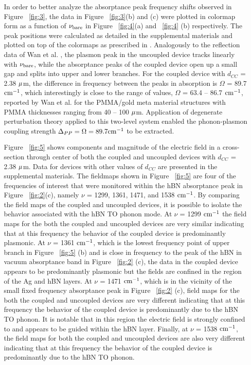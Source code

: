 \documentclass[12pt]{report}
\begin{document}
    In order to better analyze the absorptance peak frequency shifts observed in Figure ~\ref{fig:3}, the data in Figure ~\ref{fig:3}(b) and (c) were plotted in colormap form as a function of $\nu_{\rm{bare}}$ in Figure ~\ref{fig:4}(a) and ~\ref{fig:4} (b) respectively. The peak positions were calculated as detailed in the supplemental materials and plotted on top of the colormaps as prescribed in \cite{Wan:16}. Analogously to the reflection data of Wan et al. \cite{Wan:16}, the plasmon peak in the uncoupled device tracks linearly with $\nu_{\rm{bare}}$, while the absorptance peaks of the coupled device open up a small gap and splits into upper and lower branches. For the coupled device with $d_{CC}$ = 2.38 $\rm \mu$m, the difference in frequency between the peaks in absorption is $\Omega$ = 89.7 $\rm cm^{-1}$, which interestingly is close to the range of values, $\Omega$ = 63.4 – 86.7 $\rm cm^{-1}$, reported by Wan et al. for the PMMA/gold meta material structures with PMMA thicknesses ranging from 40 – 100 $\rm \mu$m. Application of degenerate perturbation theory \cite{Sakurai:17} applied to this two-level system enabled the phonon-plasmon coupling strength $\Delta_{PP} = \rm  \Omega = 89.7 cm^{-1}$ to be extracted.

    Figure ~\ref{fig:5} shows components and magnitude of the electric field in a cross-section through center of both the coupled and uncoupled devices with $d_{CC}$  = 2.38 $\rm \mu$m. Data for devices with other values of $d_{CC}$  are presented in the supplemental materials. The fieldmaps shown in Figure ~\ref{fig:5} are four of the frequencies of interest that were monitored within the hBN absorptance peak in Figure ~\ref{fig:2}(c), namely $\nu$ = 1299, 1361, 1471, and 1538 $\rm cm^{-1}$. By comparing the field maps of the coupled and uncoupled devices, it is possible to isolate the behavior associated with the hBN TO phonon mode. At $\nu$ = 1299 $\rm cm^{-1}$ the field maps for the both the coupled and uncoupled devices are very similar indicating that at this frequency the behavior of the coupled device is predominantly plasmonic. At $\nu$ = 1361 $\rm cm^{-1}$, which is the lowest frequency point of upper branch in Figure ~\ref{fig:5} (b) and is close in frequency to the peak of the hBN in vacuum absorptance band in Figure ~\ref{fig:2} (c), the data in the coupled device appears to be predominantly plasmonic but the fields are confined in the region of the Ag and hBN layers. At $\nu$ = 1471 $\rm cm^{-1}$, which is in the vicinity of the small fixed frequency absorptance peak in Figure ~\ref{fig:2} (c), field maps for the both the coupled and uncoupled devices are very different indicating that at this frequency the behavior of the coupled device is predominantly due to the hBN TO phonon. It is notable that in this region the electric field is strongly confined to and appears to be guided within the hBN layer. Finally, at $\nu$ = 1538 $\rm cm^{-1}$, the field maps for both the coupled and uncoupled devices are also very different indicating that at this frequency the behavior of the coupled device is predominantly due to the hBN TO phonon.
\end{document}
